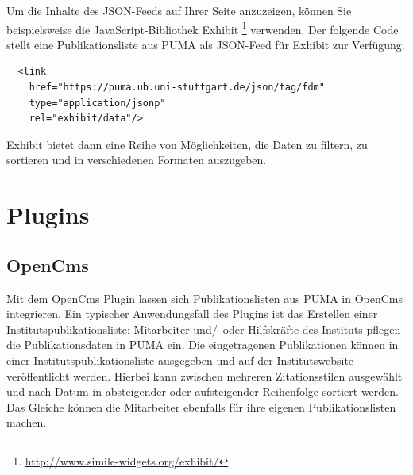 Um die Inhalte des  JSON-Feeds auf Ihrer Seite anzuzeigen, können Sie beispielsweise die JavaScript-Bibliothek Exhibit \footnote{\url{http://www.simile-widgets.org/exhibit/}} verwenden. Der folgende Code stellt eine Publikationsliste aus PUMA als JSON-Feed für Exhibit zur Verfügung.

\lstset{language=HTML}
\begin{lstlisting}
  <link
    href="https://puma.ub.uni-stuttgart.de/json/tag/fdm"
    type="application/jsonp"
    rel="exhibit/data"/> 
\end{lstlisting}

Exhibit bietet dann eine Reihe von Möglichkeiten, die Daten zu filtern, zu sortieren und in verschiedenen Formaten auszugeben.

\section{Plugins} 
\label{sec:plugins}
\subsection{OpenCms}
\label{subsec:opencms}
Mit dem OpenCms Plugin lassen sich Publikationslisten aus PUMA in OpenCms integrieren. Ein typischer Anwendungsfall des Plugins ist das Erstellen einer Instituts\-publi\-kations\-liste: Mitarbeiter und/~oder Hilfskräfte des Instituts pflegen die Publikationsdaten in PUMA ein. Die eingetragenen Publikationen können in einer Instituts\-publi\-kations\-liste ausgegeben und auf der Instituts\-website veröffentlicht werden. Hierbei kann zwischen mehreren Zitationsstilen ausgewählt und nach Datum in absteigender oder aufsteigender Reihenfolge sortiert werden. Das Gleiche können die Mitarbeiter ebenfalls für ihre eigenen Publikationslisten machen.
